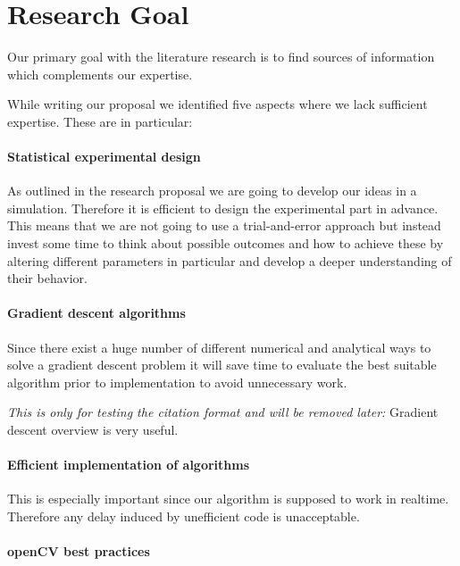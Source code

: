 \documentclass[titlepage, a4paper, 11pt]{scrartcl}
\begin{document}
\section{Research Goal}

Our primary goal with the literature research is to find sources of information which complements our expertise. 

While writing our proposal we identified five aspects where we lack sufficient expertise.
These are in particular:

\paragraph{Statistical experimental design}

As outlined in the research proposal we are going to develop our ideas in a simulation. Therefore it is efficient to design the experimental part in advance.
This means that we are not going to use a trial-and-error approach but instead invest some time to think about possible outcomes and how to achieve these by 
altering different parameters in particular and develop a deeper understanding of their behavior.

\paragraph{Gradient descent algorithms}

Since there exist a huge number of different numerical and analytical ways to solve a gradient descent problem it will save time to evaluate the best
suitable algorithm prior to implementation to avoid unnecessary work.

\textit{This is only for testing the citation format and will be removed later:}
Gradient descent overview \citep{ruder2016overview} is very useful.

\paragraph{Efficient implementation of algorithms}

This is especially important since our algorithm is supposed to work in realtime.
Therefore any delay induced by unefficient code is unacceptable.

\paragraph{openCV best practices}
\end{document}
